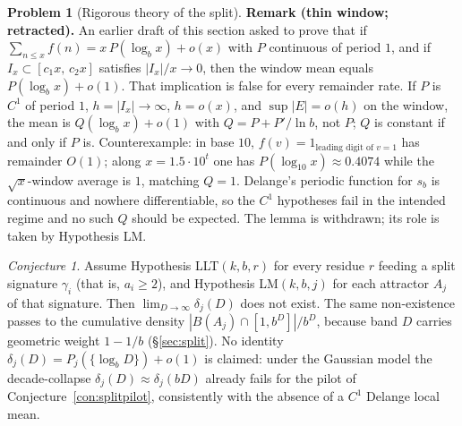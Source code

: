 \documentclass[11pt]{article}
\theoremstyle{definition}
\newtheorem{problem}[theorem]{Problem}
\theoremstyle{remark}
\newtheorem{conjecture}[theorem]{Conjecture}
\begin{document}
\begin{problem}[Rigorous theory of the split]
\medskip\noindent\textbf{Remark (thin window; retracted).} An earlier draft of this section asked to prove that if $\sum_{n\le x}f(n)=x\,P(\log_b x)+o(x)$ with $P$ continuous of period $1$, and if $I_x\subset[c_1 x,\,c_2 x]$ satisfies $|I_x|/x\to 0$, then the window mean equals $P(\log_b x)+o(1)$. That implication is false for every remainder rate. If $P$ is $C^1$ of period $1$, $h=|I_x|\to\infty$, $h=o(x)$, and $\sup|E|=o(h)$ on the window, the mean is $Q(\log_b x)+o(1)$ with $Q=P+P'/\ln b$, not $P$; $Q$ is constant if and only if $P$ is. Counterexample: in base $10$, $f(v)=1_{\text{leading digit of }v=1}$ has remainder $O(1)$; along $x=1.5\cdot 10^t$ one has $P(\log_{10}x)\approx 0.4074$ while the $\sqrt{x}$-window average is $1$, matching $Q=1$. Delange's periodic function for $s_b$ is continuous and nowhere differentiable, so the $C^1$ hypotheses fail in the intended regime and no such $Q$ should be expected. The lemma is withdrawn; its role is taken by Hypothesis LM.
\end{problem}

\begin{conjecture}\label{con:split}
Assume Hypothesis LLT$(k,b,r)$ for every residue $r$ feeding a split signature $\gamma_i$ (that is, $a_i\ge 2$), and Hypothesis LM$(k,b,j)$ for each attractor $A_j$ of that signature. Then $\lim_{D\to\infty}\delta_j(D)$ does not exist. The same non-existence passes to the cumulative density $|B(A_j)\cap[1,b^D]|/b^D$, because band $D$ carries geometric weight $1-1/b$ (\S\ref{sec:split}). No identity $\delta_j(D)=P_j(\{\log_b D\})+o(1)$ is claimed: under the Gaussian model the decade-collapse $\delta_j(D)\approx\delta_j(bD)$ already fails for the pilot of Conjecture~\ref{con:splitpilot}, consistently with the absence of a $C^1$ Delange local mean.
\end{conjecture}
\end{document}
